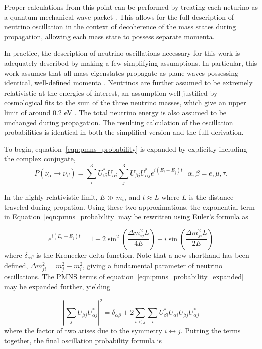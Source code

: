 Proper calculations from this point can be performed by treating each neturino as a quantum mechanical wave packet \cite{OscillationWavePackets}.
This allows for the full description of neutrino oscillation in the context of decoherence of the mass states during propagation, allowing each mass state to possess separate momenta.

In practice, the description of neutrino oscillations necessary for this work is adequately described by making a few simplifying assumptions.
In particular, this work assumes that all mass eigenstates propagate as plane waves possessing identical, well-defined momenta \cite{Review-PMNS}.
Neutrinos are further assumed to be extremely relativistic at the energies of interest, an assumption well-justified by cosmological fits to the sum of the three neutrino masses, which give an upper limit of around 0.2 eV \cite{PDG-2015}.
The total neutrino energy is also assumed to be unchanged during propagation.
The resulting calculation of the oscillation probabilities is identical in both the simplified version and the full derivation.

To begin, equation~\ref{eqn:pmns_probability} is expanded by explicitly including the complex conjugate,  
\begin{equation}
P\left(\nu_\alpha\rightarrow\nu_\beta\right) =  \sum_i^3 U^*_{\beta i} U_{\alpha i} \sum_j^3 U_{\beta j} U^*_{\alpha j} e^{i \left(E_i-E_j\right) t} \ \ \ \alpha,\beta = e,\mu,\tau.
\label{eqn:pmns_probability_expanded}
\end{equation}

In the highly relativistic limit, $E \gg m_{i}$, and $t \approx L$ where $L$ is the distance traveled during propation.
Using these two approximations, the exponential term in Equation~\ref{eqn:pmns_probability} may be rewritten using Euler's formula as

\begin{equation}
 e^{i \left(E_i-E_j\right) t} = 1 - 2\sin^2\left(\frac{\Delta m_{ij}^2 L}{4E}\right) + i \sin\left(\frac{\Delta m_{ji}^2 L}{2E}\right)
\end{equation}
%
where $\delta_{\alpha \beta}$ is the Kronecker delta function.
Note that a new shorthand has been defined, ${\Delta m^2_{ji} = m^2_j - m^2_i}$, giving a fundamental parameter of neutrino oscillations.
The PMNS terms of equation~\ref{eqn:pmns_probability_expanded} may be expanded further, yielding 

\begin{equation}
\left| \sum_j U_{\beta j} U^*_{\alpha j}\right|^2 = \delta_{\alpha \beta} + 2 \sum_{i<j} \sum_i U^*_{\beta i} U_{\alpha i}  U_{\beta j} U^*_{\alpha j}
\end{equation}
%
where the factor of two arises due to the symmetry ${i \leftrightarrow j}$.
Putting the terms together, the final oscillation probability formula is

